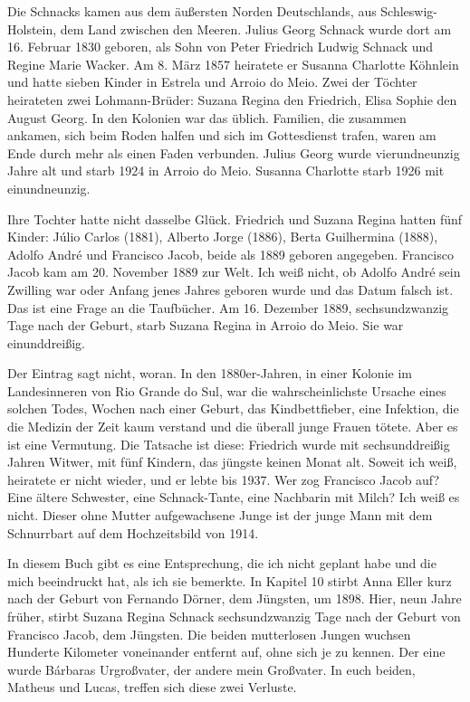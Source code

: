 \documentclass[
  ngerman,
  11pt,
  openany]{book}
\begin{document}
Die Schnacks kamen aus dem äußersten Norden Deutschlands, aus
Schleswig-Holstein, dem Land zwischen den Meeren. Julius Georg Schnack
wurde dort am 16. Februar 1830 geboren, als Sohn von Peter Friedrich
Ludwig Schnack und Regine Marie Wacker. Am 8. März 1857 heiratete er
Susanna Charlotte Köhnlein und hatte sieben Kinder in Estrela und Arroio
do Meio. Zwei der Töchter heirateten zwei Lohmann-Brüder: Suzana Regina
den Friedrich, Elisa Sophie den August Georg. In den Kolonien war das
üblich. Familien, die zusammen ankamen, sich beim Roden halfen und sich
im Gottesdienst trafen, waren am Ende durch mehr als einen Faden
verbunden. Julius Georg wurde vierundneunzig Jahre alt und starb 1924 in
Arroio do Meio. Susanna Charlotte starb 1926 mit einundneunzig.

Ihre Tochter hatte nicht dasselbe Glück. Friedrich und Suzana Regina
hatten fünf Kinder: Júlio Carlos (1881), Alberto Jorge (1886), Berta
Guilhermina (1888), Adolfo André und Francisco Jacob, beide als 1889
geboren angegeben. Francisco Jacob kam am 20. November 1889 zur Welt.
Ich weiß nicht, ob Adolfo André sein Zwilling war oder Anfang jenes
Jahres geboren wurde und das Datum falsch ist. Das ist eine Frage an die
Taufbücher. Am 16. Dezember 1889, sechsundzwanzig Tage nach der Geburt,
starb Suzana Regina in Arroio do Meio. Sie war einunddreißig.

Der Eintrag sagt nicht, woran. In den 1880er-Jahren, in einer Kolonie im
Landesinneren von Rio Grande do Sul, war die wahrscheinlichste Ursache
eines solchen Todes, Wochen nach einer Geburt, das Kindbettfieber, eine
Infektion, die die Medizin der Zeit kaum verstand und die überall junge
Frauen tötete. Aber es ist eine Vermutung. Die Tatsache ist diese:
Friedrich wurde mit sechsunddreißig Jahren Witwer, mit fünf Kindern, das
jüngste keinen Monat alt. Soweit ich weiß, heiratete er nicht wieder,
und er lebte bis 1937. Wer zog Francisco Jacob auf? Eine ältere
Schwester, eine Schnack-Tante, eine Nachbarin mit Milch? Ich weiß es
nicht. Dieser ohne Mutter aufgewachsene Junge ist der junge Mann mit dem
Schnurrbart auf dem Hochzeitsbild von 1914.

In diesem Buch gibt es eine Entsprechung, die ich nicht geplant habe und
die mich beeindruckt hat, als ich sie bemerkte. In Kapitel 10 stirbt
Anna Eller kurz nach der Geburt von Fernando Dörner, dem Jüngsten, um
1898. Hier, neun Jahre früher, stirbt Suzana Regina Schnack
sechsundzwanzig Tage nach der Geburt von Francisco Jacob, dem Jüngsten.
Die beiden mutterlosen Jungen wuchsen Hunderte Kilometer voneinander
entfernt auf, ohne sich je zu kennen. Der eine wurde Bárbaras
Urgroßvater, der andere mein Großvater. In euch beiden, Matheus und
Lucas, treffen sich diese zwei Verluste.
\end{document}
